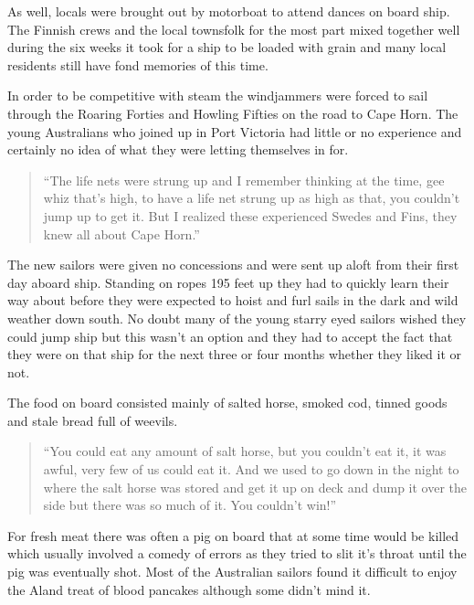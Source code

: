 \documentclass[
  11pt,
  msmallroyalvopaper
]{memoir}
\begin{document}
As well, locals were brought out by motorboat to attend dances on board
ship. The Finnish crews and the local townsfolk for the most part mixed
together well during the six weeks it took for a ship to be loaded with
grain and many local residents still have fond memories of this time.

In order to be competitive with steam the windjammers were forced to
sail through the Roaring Forties and Howling Fifties on the road to Cape
Horn. The young Australians who joined up in Port Victoria had little or
no experience and certainly no idea of what they were letting themselves
in for.

\begin{quote}
“The life nets were strung up and I remember thinking at the time, gee
whiz that’s high, to have a life net strung up as high as that, you
couldn’t jump up to get it. But I realized these experienced Swedes and
Fins, they knew all about Cape Horn.”
\end{quote}

The new sailors were given no concessions and were sent up aloft from
their first day aboard ship. Standing on ropes 195 feet up they had to
quickly learn their way about before they were expected to hoist and
furl sails in the dark and wild weather down south. No doubt many of the
young starry eyed sailors wished they could jump ship but this wasn’t an
option and they had to accept the fact that they were on that ship for
the next three or four months whether they liked it or not.

The food on board consisted mainly of salted horse, smoked cod, tinned
goods and stale bread full of weevils.

\begin{quote}
“You could eat any amount of salt horse, but you couldn’t eat it, it was
awful, very few of us could eat it. And we used to go down in the night
to where the salt horse was stored and get it up on deck and dump it
over the side but there was so much of it. You couldn’t win!”
\end{quote}

For fresh meat there was often a pig on board that at some time would be
killed which usually involved a comedy of errors as they tried to slit
it’s throat until the pig was eventually shot. Most of the Australian
sailors found it difficult to enjoy the Aland treat of blood pancakes
although some didn’t mind it.
\end{document}
